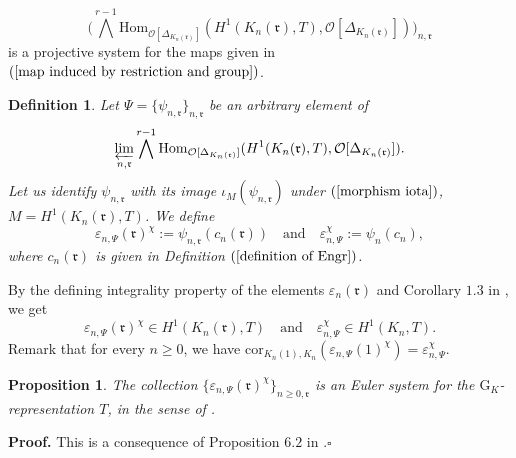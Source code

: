 \documentclass[reqno]{amsart}
\newcounter{dummy} \numberwithin{dummy}{section}
\newtheorem{pro}[dummy]{Proposition}
\newtheorem{deft}[dummy]{Definition}
\begin{document}
$$\big(\bigwedge^{r-1}\mathrm{Hom}_{\mathcal{O}[\Delta_{K_{n}(\mathfrak{r})}]}
(H^{1}(K_{n}(\mathfrak{r}),T),\mathcal{O}[\Delta_{K_{n}(\mathfrak{r})}])\big)_{n,\mathfrak{r}}$$
is a projective system for the maps given in $(\ref{map induced by
restriction and group})$.
\begin{deft}\label{definition of psi euler system}
Let $\Psi=\{\psi_{n,\mathfrak{r}}\}_{n,\mathfrak{r}}$ be an
arbitrary element of
$$\displaystyle{\varprojlim_{n,\mathfrak{r}}}\bigwedge^{r-1}\mathrm{Hom}_{\mathcal{O}[\Delta_{K_{n}(\mathfrak{r})}]}
(H^{1}(K_{n}(\mathfrak{r}),T),\mathcal{O}[\Delta_{K_{n}(\mathfrak{r})}]).$$
Let us identify $\psi_{n,\mathfrak{r}}$ with its image
$\iota_{M}(\psi_{n,\mathfrak{r}})$ under $(\ref{morphism iota})$,
$M=H^{1}(K_{n}(\mathfrak{r}),T)$. We define
$$
\varepsilon_{n,\Psi}(\mathfrak{r})^{\chi}:=\psi_{n,\mathfrak{r}}(c_{n}(\mathfrak{r}))\quad\mbox{and}\quad
\varepsilon_{n,\Psi}^{\chi}:=\psi_{n}(c_{n}),
$$
where $c_{n}(\mathfrak{r})$ is given  in Definition
$(\ref{definition of Engr})$.
\end{deft}
By the defining
 integrality property of the elements
 $\varepsilon_{n}(\mathfrak{r})$ and
 Corollary $1.3$ in \cite{Rubin96}, we get
 $$
\varepsilon_{n,\Psi}(\mathfrak{r})^{\chi}\in
H^{1}(K_{n}(\mathfrak{r}),T)\quad\mbox{and}\quad
\varepsilon_{n,\Psi}^{\chi}\in H^{1}(K_{n},T) .
$$
Remark that for every $n\geq 0$, we have
$\mathrm{cor}_{K_{n}(1),K_{n}}(\varepsilon_{n,\Psi}(\mathfrak{1})^{\chi})=\varepsilon_{n,\Psi}^{\chi}$.
\begin{pro}\label{Euler system}
The collection $\{\varepsilon_{n,\Psi}(\mathfrak{r})^{\chi}\}_{n\geq
0, \mathfrak{r}}$ is an Euler system for the
$\mathrm{G}_{K}$-representation $T$, in the sense of
\cite[Definition 2.1.1]{Rubin00}.
\end{pro}
\noindent \textbf{Proof.} This is a consequence of Proposition $6.2$
in \cite{Rubin96}.\hfill $\square$
\end{document}
